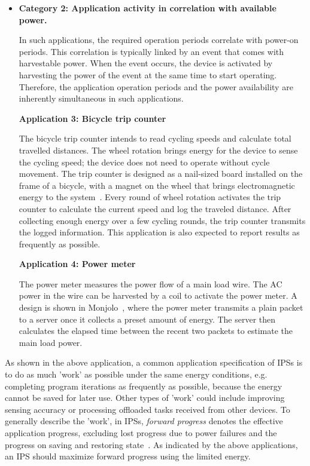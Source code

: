 \begin{itemize}
  \item \textbf{Category 2: Application activity in correlation with available power.}
  
  In such applications, the required operation periods correlate with power-on periods. 
  This correlation is typically linked by an event that comes with harvestable power. 
  When the event occurs, the device is activated by harvesting the power of the event at the same time to start operating. 
  Therefore, the application operation periods and the power availability are inherently simultaneous in such applications. 

  \textbf{Application 3: Bicycle trip counter}

  The bicycle trip counter intends to read cycling speeds and calculate total travelled distances. 
  The wheel rotation brings energy for the device to sense the cycling speed; the device does not need to operate without cycle movement. 
  The trip counter is designed as a nail-sized board installed on the frame of a bicycle, with a magnet on the wheel that brings electromagnetic energy to the system~\cite{bing2018energy}. 
  Every round of wheel rotation activates the trip counter to calculate the current speed and log the traveled distance. 
  After collecting enough energy over a few cycling rounds, the trip counter transmits the logged information. 
  This application is also expected to report results as frequently as possible. 

  \textbf{Application 4: Power meter}

  The power meter measures the power flow of a main load wire. 
  The AC power in the wire can be harvested by a coil to activate the power meter. 
  A design is shown in Monjolo~\cite{debruin2013monjolo}, where the power meter transmits a plain packet to a server once it collects a preset amount of energy. 
  The server then calculates the elapsed time between the recent two packets to estimate the main load power. 

\end{itemize}
  
As shown in the above application, a common application specification of IPSs is to do as much 'work' as possible under the same energy conditions, e.g. completing program iterations as frequently as possible, because the energy cannot be saved for later use. 
Other types of 'work' could include improving sensing accuracy or processing offloaded tasks received from other devices. 
To generally describe the 'work', in IPSs, \textit{forward progress} denotes the effective application progress, excluding lost progress due to power failures and the progress on saving and restoring state~\cite{7478428}.
As indicated by the above applications, an IPS should maximize forward progress using the limited energy. 

